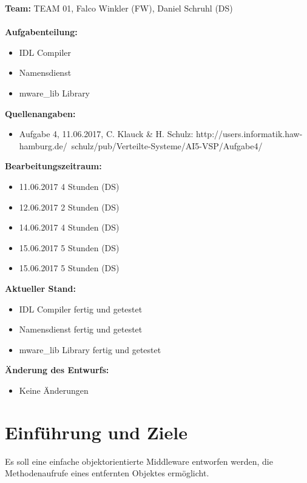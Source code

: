 \documentclass{article}
\begin{document}
\textbf{Team:} TEAM 01, Falco Winkler (FW), Daniel Schruhl (DS)\\
\\
\textbf{Aufgabenteilung:}
\begin{itemize}
    \item IDL Compiler
    \item Namensdienst
    \item mware\_lib Library
\end{itemize}

\textbf{Quellenangaben:}
\begin{itemize}
    \item Aufgabe 4, 11.06.2017, C. Klauck \& H. Schulz: \newline
    http://users.informatik.haw-hamburg.de/~schulz/pub/Verteilte-Systeme/AI5-VSP/Aufgabe4/
\end{itemize}

\textbf{Bearbeitungszeitraum:}
\begin{itemize}
	\item 11.06.2017 4 Stunden (DS)
	\item 12.06.2017 2 Stunden (DS)
	\item 14.06.2017 4 Stunden (DS)
	\item 15.06.2017 5 Stunden (DS)
	\item 15.06.2017 5 Stunden (DS)
\end{itemize}

\textbf{Aktueller Stand:}
\begin{itemize}
	\item IDL Compiler fertig und getestet
    \item Namensdienst fertig und getestet
    \item mware\_lib Library fertig und getestet
\end{itemize}

\textbf{Änderung des Entwurfs:}
\begin{itemize}
    \item Keine Änderungen
\end{itemize}

\newpage

\section{Einführung und Ziele}
Es soll eine einfache objektorientierte Middleware entworfen werden, die Methodenaufrufe
eines entfernten Objektes ermöglicht.\\
\end{document}
